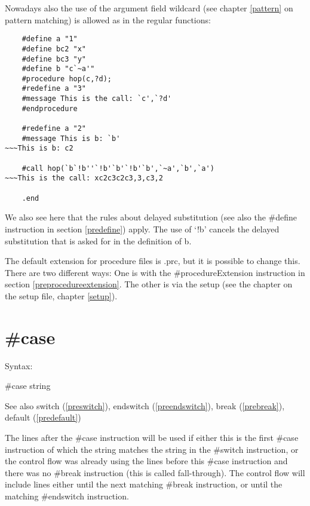 Nowadays also the use of the argument field wildcard (see chapter 
\ref{pattern} on pattern matching) is allowed as in the 
regular functions:
\begin{verbatim}
    #define a "1"
    #define bc2 "x"
    #define bc3 "y"
    #define b "c`~a'"
    #procedure hop(c,?d);
    #redefine a "3"
    #message This is the call: `c',`?d'
    #endprocedure
    
    #redefine a "2"
    #message This is b: `b'
~~~This is b: c2
    
    #call hop(`b`!b''`!b'`b'`!b'`b',`~a',`b',`a')
~~~This is the call: xc2c3c2c3,3,c3,2
    
    .end
\end{verbatim}
We also see here that the rules about delayed substitution (see also the 
\#define instruction in section \ref{predefine}) apply. The 
use of `!b' cancels the delayed substitution that is asked for in the 
definition of b.

The default extension for procedure files is .prc, but it is 
possible to change this. There are two different ways: One is with the 
\#procedureExtension instruction in section 
\ref{preprocedureextension}. The other is via the setup (see the chapter on 
the setup file, chapter \ref{setup}).


\section{\#case}
\label{precase}

\noindent Syntax:

\#case string
 
\noindent See also switch (\ref{preswitch}),
        endswitch (\ref{preendswitch}),
        break (\ref{prebreak}),
        default (\ref{predefault})

\noindent The lines after the \#case instruction will be used 
if either this is the first \#case instruction of which the 
string matches the string in the \#switch instruction, or 
the control flow was already using the lines before this \#case instruction 
and there was no \#break instruction (this is called 
fall-through). The control flow will include lines either until the next 
matching \#break instruction, or until the matching 
\#endswitch instruction.

